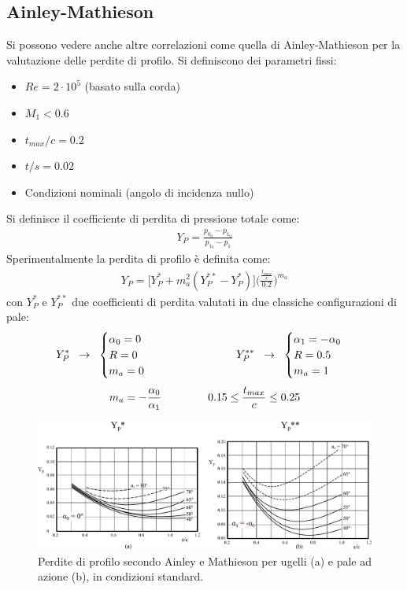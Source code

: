 \subsection{Ainley-Mathieson}
Si possono vedere anche altre correlazioni come quella di Ainley-Mathieson per la valutazione delle perdite di profilo. Si definiscono dei parametri fissi:
\begin{itemize}
\item $Re = 2 \cdot 10^5$ (basato sulla corda)
\item $M_1 < 0.6$
\item $t_{max}/c = 0.2$
\item $t/s = 0.02$
\item Condizioni nominali (angolo di incidenza nullo)
\end{itemize}
Si definisce il coefficiente di perdita di pressione totale come:
\begin{align*}
Y_P = \frac{p_{0_0} - p_{1_0}}{p_{1_0} - p_1}
\end{align*}
Sperimentalmente la perdita di profilo è definita come:
\begin{align*}
Y_P = \big[ Y_P^* + m_a^2 \left( Y_P^{**} - Y_P^* \right) \big] \Biggl(\frac{\frac{t_{max}}{c}}{0.2} \Biggr)^{m_a}
\end{align*}
con $Y_P^*$ e $Y_P^{**}$ due coefficienti di perdita valutati in due classiche configurazioni di pale:
\begin{align*}
Y_P^* \;\; \to \;\;
\begin{cases}
\alpha_0 = 0\\
R = 0\\
m_a = 0
\end{cases} \hspace{2.5cm}
Y_P^{**} \;\; \to \;\;
\begin{cases}
\alpha_1 = -\alpha_0\\
R = 0.5\\
m_a = 1
\end{cases}
\end{align*}
\begin{align*}
m_a = - \frac{\alpha_0}{\alpha_1} \hspace{1.5cm} 0.15 \leq \frac{t_{max}}{c} \leq 0.25
\end{align*}
\begin{figure}
\centering
  \includegraphics[width=\textwidth]{fig/Mathieson.pdf}
\caption{Perdite di profilo secondo Ainley e Mathieson per ugelli (a) e pale ad azione (b), in condizioni standard.}
\label{fig:Mathieson}
\end{figure}
